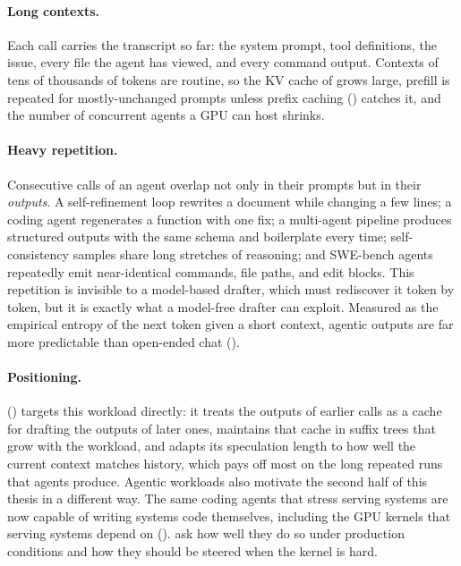 \paragraph{Long contexts.}
Each call carries the transcript so far: the system prompt, tool definitions, the issue, every file the agent has viewed, and every command output.
Contexts of tens of thousands of tokens are routine, so the KV cache of  grows large, prefill is repeated for mostly-unchanged prompts unless prefix caching () catches it, and the number of concurrent agents a GPU can host shrinks.

\paragraph{Heavy repetition.}
Consecutive calls of an agent overlap not only in their prompts but in their \emph{outputs}.
A self-refinement loop rewrites a document while changing a few lines; a coding agent regenerates a function with one fix; a multi-agent pipeline produces structured outputs with the same schema and boilerplate every time; self-consistency samples share long stretches of reasoning; and SWE-bench agents repeatedly emit near-identical commands, file paths, and edit blocks.
This repetition is invisible to a model-based drafter, which must rediscover it token by token, but it is exactly what a model-free drafter can exploit.
Measured as the empirical entropy of the next token given a short context, agentic outputs are far more predictable than open-ended chat ().

\paragraph{Positioning.}
\SuffixDecoding () targets this workload directly: it treats the outputs of earlier calls as a cache for drafting the outputs of later ones, maintains that cache in suffix trees that grow with the workload, and adapts its speculation length to how well the current context matches history, which pays off most on the long repeated runs that agents produce.
Agentic workloads also motivate the second half of this thesis in a different way.
The same coding agents that stress serving systems are now capable of writing systems code themselves, including the GPU kernels that serving systems depend on ().
 ask how well they do so under production conditions and how they should be steered when the kernel is hard.

